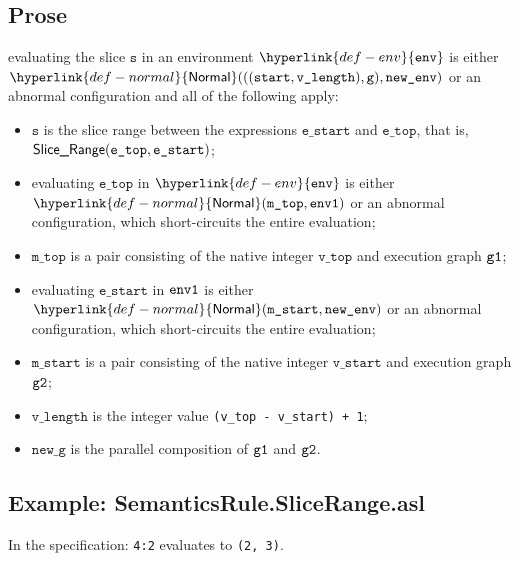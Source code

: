 \documentclass{book}
\newcommand\ProseOrAbnormal[0]{or an abnormal configuration, which short-circuits the entire evaluation}
\newcommand\Normal[0]{\hyperlink{def-normal}{\textsf{Normal}}}
\newcommand\env[0]{\hyperlink{def-env}{\texttt{env}}}
\newcommand\vg[0]{\texttt{g}}
\newcommand\newg[0]{\texttt{new\_g}}
\newcommand\vs[0]{\texttt{s}}
\newcommand\start[0]{\texttt{start}}
\newcommand\mstart[0]{\texttt{m\_start}}
\newcommand\vstart[0]{\texttt{v\_start}}
\newcommand\estart[0]{\texttt{e\_start}}
\newcommand\vlength[0]{\texttt{v\_length}}
\newcommand\etop[0]{\texttt{e\_top}}
\newcommand\vvsubtop[0]{\texttt{v\_top}}
\newcommand\mtop[0]{\texttt{m\_top}}
\begin{document}
  \subsection{Prose}
  evaluating the slice $\vs$ in an environment $\env$ is either \\
  $\Normal(((\start, \vlength), \vg), \newenv)$
  or an abnormal configuration and all of the following apply:
  \begin{itemize}
    \item $\vs$ is the slice range between the
      expressions $\estart$ and $\etop$, that is, \\ $\SliceRange(\etop, \estart)$;
    \item evaluating $\etop$ in $\env$ is either $\Normal(\mtop, \envone)$ \ProseOrAbnormal;
    \item $\mtop$ is a pair consisting of the native integer $\vvsubtop$ and execution graph $\texttt{g1}$;
    \item evaluating $\estart$ in $\texttt{env1}$ is either $\Normal(\mstart, \newenv)$ \ProseOrAbnormal;
    \item $\mstart$ is a pair consisting of the native integer $\vstart$ and execution graph $\texttt{g2}$;
    \item $\vlength$ is the integer value \texttt{(v\_top - v\_start) + 1};
    \item $\newg$ is the parallel composition of $\texttt{g1}$ and $\texttt{g2}$.
  \end{itemize}

  \subsection{Example: SemanticsRule.SliceRange.asl}
  In the specification:
  \texttt{4:2} evaluates to \texttt{(2, 3)}.


\end{document}

